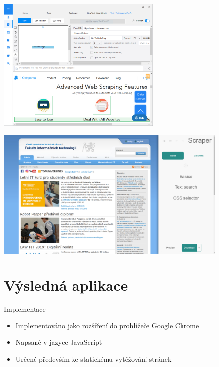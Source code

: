 \documentclass[czech,aspectratio=169]{beamer}
\begin{document}
	\begin{frame}
		\begin{center}
			\includegraphics[width=0.6\textwidth]{assets/Octoparse.png}
		\end{center}
	\end{frame}

	\begin{frame}
		\begin{center}
			\includegraphics[width=0.85\textwidth]{assets/Scraper_control_panel.png}
		\end{center}
	\end{frame}
	
	
	\section{Výsledná aplikace}
	\begin{frame}{Implementace}
		\begin{itemize}
			\item Implementováno jako rozšíření do prohlížeče Google Chrome
			\item Napsané v jazyce JavaScript
			\item Určené především ke statickému vytěžování stránek
		\end{itemize}
	\end{frame}
\end{document}
